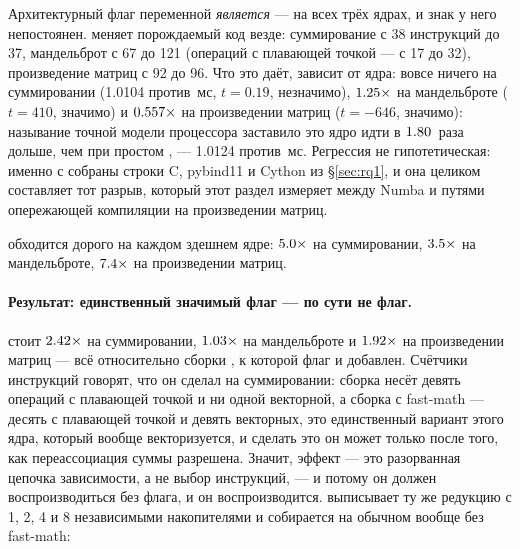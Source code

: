 Архитектурный флаг переменной \emph{является} --- на всех трёх ядрах, и знак у него непостоянен.
 меняет порождаемый код везде: суммирование с 38 инструкций до 37, мандельброт
с 67 до 121 (операций с плавающей точкой --- с 17 до 32), произведение матриц с 92 до 96. Что это
даёт, зависит от ядра: вовсе ничего на суммировании (1.0104 против \,мс, $t=0.19$,
незначимо), $\meas{ratio:b1_flags-314:mandelbrot/O2|b1_flags-314:mandelbrot/O3native}{1.25}\times$ на мандельброте ($t=410$, значимо) и $\meas{ratio:b1_flags-314:matmul/O2|b1_flags-314:matmul/O3native}{0.557}\times$ на произведении матриц
($t=-646$, значимо): называние точной модели процессора заставило это ядро идти в
$\meas{ratio:b1_flags-314:matmul/O3native|b1_flags-314:matmul/O2}{1.80}$~раза дольше, чем при простом , --- 1.0124 против \,мс. Регрессия не
гипотетическая: именно с
 собраны строки C, pybind11 и Cython из \S\ref{sec:rq1}, и она целиком
составляет тот разрыв, который этот раздел измеряет между Numba и путями опережающей компиляции на
произведении матриц.

 обходится дорого на каждом здешнем ядре: $\meas{ratio:b1_flags-314:arraysum/O0|b1_flags-314:arraysum/O2}{5.0}\times$ на суммировании, $\meas{ratio:b1_flags-314:mandelbrot/O0|b1_flags-314:mandelbrot/O2}{3.5}\times$ на
мандельброте, $\meas{ratio:b1_flags-314:matmul/O0|b1_flags-314:matmul/O2}{7.4}\times$ на произведении матриц.

\paragraph{Результат: единственный значимый флаг --- по сути не флаг.}  стоит
$\meas{ratio:b1_flags-314:arraysum/O3native|b1_flags-314:arraysum/O3native_ffast}{2.42}\times$ на суммировании, $\meas{ratio:b1_flags-314:mandelbrot/O3native|b1_flags-314:mandelbrot/O3native_ffast}{1.03}\times$ на мандельброте и $\meas{ratio:b1_flags-314:matmul/O3native|b1_flags-314:matmul/O3native_ffast}{1.92}\times$ на произведении матриц ---
всё относительно сборки , к которой флаг и добавлен. Счётчики инструкций говорят, что он сделал на суммировании: сборка
 несёт девять операций с плавающей точкой и ни одной векторной, а сборка с fast-math ---
десять с плавающей точкой и девять векторных, это единственный вариант этого ядра, который вообще
векторизуется, и сделать это он может только после того, как переассоциация суммы разрешена. Значит,
эффект --- это разорванная цепочка зависимости, а не выбор инструкций, --- и потому он должен
воспроизводиться без флага, и он воспроизводится.  выписывает ту же редукцию с 1,
2, 4 и 8 независимыми накопителями и собирается на обычном  вообще без fast-math:


